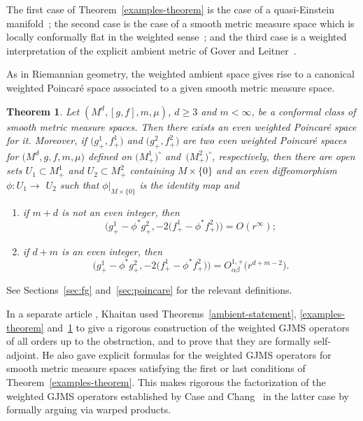 \documentclass[pdftex]{sigma}
\numberwithin{equation}{section}
\newtheorem{Theorem}{Theorem}[section]
\begin{document}
The first case of Theorem~\ref{examples-theorem} is the case of a quasi-Einstein manifold~\cite{Case_Shu_Wei};
the second case is the case of a smooth metric measure space which is locally conformally flat in the weighted sense~\cite{Case2014s};
and the third case is a weighted interpretation of the explicit ambient metric of Gover and Leitner~\cite{GoverLeitner2009}.

As in Riemannian geometry, the weighted ambient space gives rise to a canonical weighted Poincar\'e space associated to a given smooth metric measure space.

\begin{Theorem}
\label{poincare-statement}
Let $(M^{d}, [g, f], m, \mu)$, $d\geq 3$ and $m<\infty$, be a conformal class of smooth metric measure spaces. Then there exists an even weighted Poincar\'e space for it. Moreover, if $\bigl(g_{+}^{1}, f_{+}^{1}\bigr)$ and $\bigl(g_{+}^{2}, f_{+}^{2}\bigr)$ are two even weighted Poincar\'e spaces for $\bigl(M^{d}, g, f, m, \mu\bigr)$ defined on $\bigl(M_{+}^{1}\bigr)^{\circ}$ and~$\bigl(M_{+}^{2}\bigr)^{\circ}$, respectively, then there are open sets $U_{1} \subset M_{+}^{1}$ and $U_{2} \subset M_{+}^{2}$ containing $M \times\{0\}$ and an even diffeomorphism $\phi\colon U_{1} \rightarrow$ $U_{2}$ such that $\phi|_{M \times\{0\}}$ is the identity map and
\begin{enumerate}[label=$(\roman*)$]\itemsep=0pt
\item if $m+d$ is not an even integer, then
\[
\bigl(g_{+}^{1}-\phi^{*} g_{+}^{2}, -2\big(f_{+}^{1}-\phi^{*} f_{+}^{2}\big)\bigr)=O(r^{\infty});
\]

\item if $d+m$ is an even integer, then
\[
\bigl(g_{+}^{1}-\phi^{*} g_{+}^{2}, -2\big(f_{+}^{1}-\phi^{*} f_{+}^{2}\big)\bigr)=O_{\alpha \beta}^{1,+}\big(r^{d+m-2}\big).
\]
\end{enumerate}
\end{Theorem}
See Sections~\ref{sec:fg} and~\ref{sec:poincare} for the relevant definitions.

In a separate article \cite{Khaitan2022}, Khaitan used Theorems~\ref{ambient-statement}, \ref{examples-theorem} and~\ref{poincare-statement} to give a rigorous construction of the weighted GJMS operators of all orders up to the obstruction, and to prove that they are formally self-adjoint. He also gave explicit formulas for the weighted GJMS operators for smooth metric measure spaces satisfying the first or last conditions of Theorem~\ref{examples-theorem}.
This makes rigorous the factorization of the weighted GJMS operators established by Case and Chang~\cite{CaseChang2013} in the latter case by formally arguing via warped products.
\end{document}
